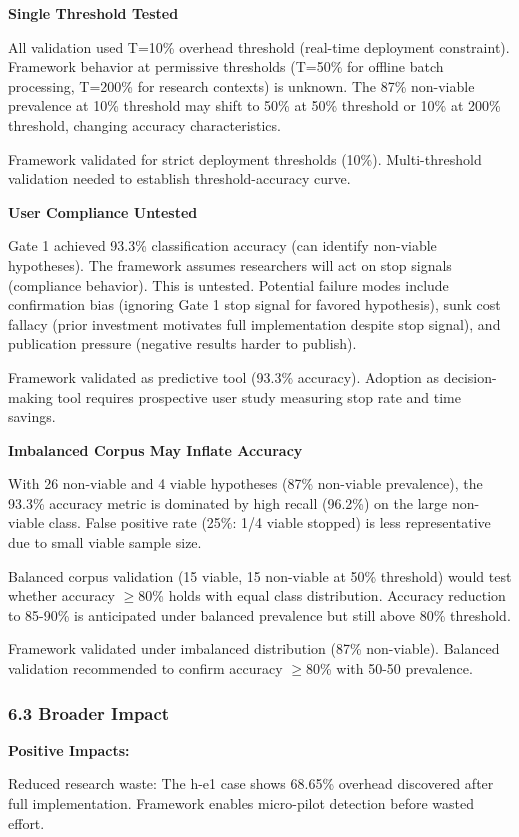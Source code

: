 \textbf{Single Threshold Tested}

All validation used T=10\% overhead threshold (real-time deployment constraint). Framework behavior at permissive thresholds (T=50\% for offline batch processing, T=200\% for research contexts) is unknown. The 87\% non-viable prevalence at 10\% threshold may shift to 50\% at 50\% threshold or 10\% at 200\% threshold, changing accuracy characteristics.

Framework validated for strict deployment thresholds (10\%). Multi-threshold validation needed to establish threshold-accuracy curve.

\textbf{User Compliance Untested}

Gate 1 achieved 93.3\% classification accuracy (can identify non-viable hypotheses). The framework assumes researchers will act on stop signals (compliance behavior). This is untested. Potential failure modes include confirmation bias (ignoring Gate 1 stop signal for favored hypothesis), sunk cost fallacy (prior investment motivates full implementation despite stop signal), and publication pressure (negative results harder to publish).

Framework validated as predictive tool (93.3\% accuracy). Adoption as decision-making tool requires prospective user study measuring stop rate and time savings.

\textbf{Imbalanced Corpus May Inflate Accuracy}

With 26 non-viable and 4 viable hypotheses (87\% non-viable prevalence), the 93.3\% accuracy metric is dominated by high recall (96.2\%) on the large non-viable class. False positive rate (25\%: 1/4 viable stopped) is less representative due to small viable sample size.

Balanced corpus validation (15 viable, 15 non-viable at 50\% threshold) would test whether accuracy $\geq 80$\% holds with equal class distribution. Accuracy reduction to 85-90\% is anticipated under balanced prevalence but still above 80\% threshold.

Framework validated under imbalanced distribution (87\% non-viable). Balanced validation recommended to confirm accuracy $\geq 80$\% with 50-50 prevalence.

\subsubsection{6.3 Broader Impact}

\textbf{Positive Impacts:}

Reduced research waste: The h-e1 case shows 68.65\% overhead discovered after full implementation. Framework enables micro-pilot detection before wasted effort.

